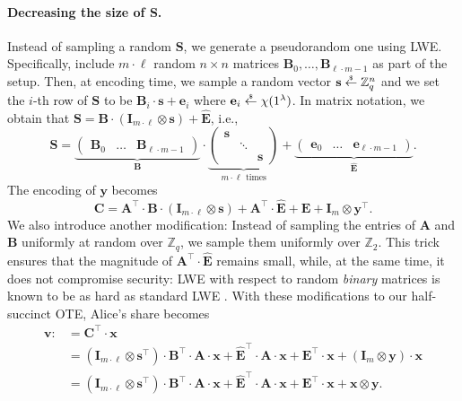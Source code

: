 \documentclass{theoretics}
\newcommand{\getsr}{\overset{\raisebox{-1pt}{$\scriptscriptstyle \$$}}{\gets}}
\newcommand{\sample}{\getsr}
\newcommand{\Z}{\mathbb{Z}}
\renewcommand{\sec}{\ensuremath{\lambda}}
\newcommand{\id}{\ensuremath{\mathbf{I}}}
\newcommand\bbbone{1}
\begin{document}
\paragraph{Decreasing the size of $\mathbf{S}$.} Instead of sampling a random $\mathbf{S}$, we generate a pseudorandom one using LWE. Specifically, include $m\cdot \ell$ random $n\times n$ matrices $\mathbf{B}_0, \dots, \mathbf{B}_{\ell\cdot m-1}$ as part of the setup. Then, at encoding time, we sample a random vector $\mathbf{s}\sample\Z_q^n$ and we set the $i$-th row of $\mathbf{S}$ to be $\mathbf{B}_i\cdot \mathbf{s}+\mathbf{e}_i$ where $\mathbf{e}_i\sample\chi(\bbbone^\sec)$. In matrix notation, we obtain that $\mathbf{S}=\mathbf{B}\cdot (\id_{m\cdot \ell}\otimes \mathbf{s})+\hat{\mathbf{E}}$, i.e.,
\[\mathbf{S}=\underbrace{\begin{pmatrix}
\mathbf{B}_0 & \dots & \mathbf{B}_{\ell\cdot m-1}
    \end{pmatrix}}_{\mathbf{B}}\cdot \underbrace{\begin{pmatrix}
\mathbf{s} &  &\\
&\ddots &\\
&&\mathbf{s}
    \end{pmatrix}}_{m\cdot \ell \text{ times}}+\underbrace{\begin{pmatrix}
\mathbf{e}_0 & \dots & \mathbf{e}_{\ell\cdot m-1}
    \end{pmatrix}}_{\hat{\mathbf{E}}}.\]
The encoding of $\mathbf{y}$ becomes
\[\mathbf{C}=\mathbf{A}^\intercal\cdot \mathbf{B}\cdot (\id_{m\cdot \ell}\otimes \mathbf{s})+\mathbf{A}^\intercal \cdot \hat{\mathbf{E}}+\mathbf{E}+\id_m\otimes \mathbf{y}^\intercal.\]
We also introduce another modification: Instead of sampling the entries of $\mathbf{A}$ and $\mathbf{B}$ uniformly at random over $\Z_q$, we sample them uniformly over $\Z_2$. This trick ensures that the magnitude of $\mathbf{A}^\intercal \cdot \hat{\mathbf{E}}$ remains small, while, at the same time, it does not compromise security: LWE with respect to random \emph{binary} matrices is known to be as hard as standard LWE \cite{C:BLMR13}.
With these modifications to our half-succinct OTE, Alice's share becomes
\begin{align*}
\mathbf{v}:\!&=\mathbf{C}^\intercal\cdot \mathbf{x}\\
&=(\id_{m\cdot \ell}\otimes \mathbf{s}^\intercal)\cdot \mathbf{B}^\intercal\cdot \mathbf{A}\cdot \mathbf{x}+\hat{\mathbf{E}}^\intercal\cdot\mathbf{A}\cdot\mathbf{x}+\mathbf{E}^\intercal\cdot\mathbf{x}+(\id_m\otimes \mathbf{y})\cdot \mathbf{x}\\
&=(\id_{m\cdot \ell}\otimes \mathbf{s}^\intercal)\cdot \mathbf{B}^\intercal\cdot \mathbf{A}\cdot \mathbf{x}+\hat{\mathbf{E}}^\intercal\cdot\mathbf{A}\cdot\mathbf{x}+\mathbf{E}^\intercal\cdot\mathbf{x}+\mathbf{x}\otimes \mathbf{y}.
\end{align*}
\end{document}
